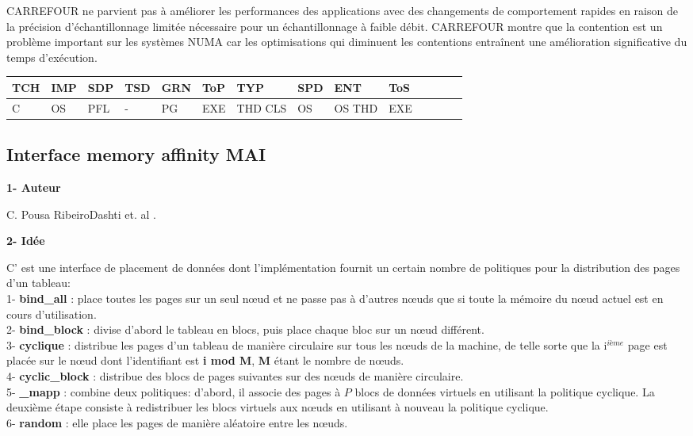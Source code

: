 CARREFOUR ne parvient pas à améliorer les performances des applications avec des changements de comportement rapides en raison de la précision d'échantillonnage limitée nécessaire pour un échantillonnage à faible débit. 
CARREFOUR montre que la contention est un problème important sur les systèmes NUMA car les optimisations qui diminuent les contentions entraînent une amélioration significative du temps d'exécution. 
%
\begin{center}%
\begin{tabular}{l *{13}{l}} 		\hline
{TCH} & {IMP} 	& {SDP} 	&  {TSD} 	& {GRN} 	& {ToP} 	& {TYP} 	& {SPD}	& {ENT} 	& {ToS} \\     		\hline
C     	& OS		& PFL		&  - 		& PG		& EXE		& THD CLS	& OS 		& OS THD  & EXE  \\     		          \hline
\end{tabular}
\end{center}
%
\subsection{Interface memory affinity MAI}    %

\textbf{1- Auteur}

C. Pousa RibeiroDashti et. al \cite{MAI77}.

\textbf{2- Idée}

C' est une interface de placement de données dont l'implémentation fournit un certain nombre de politiques pour la distribution des pages d'un tableau:\\
1- \textbf{bind\_all} : place toutes les pages sur un seul nœud et ne passe pas à d'autres nœuds que si toute la mémoire du nœud actuel est en cours d'utilisation.\\
2- \textbf{bind\_block} : divise d'abord le tableau en blocs, puis place chaque bloc sur un nœud différent.\\ 
3- \textbf{cyclique} : distribue les pages d'un tableau de manière circulaire sur tous les nœuds de la machine, de telle sorte que la i$^{ième}$ page est placée sur le nœud dont l'identifiant est \textbf{i mod M}, \textbf{M} étant le nombre de nœuds. \\
4- \textbf{cyclic\_block} : distribue des blocs de pages suivantes sur des nœuds de manière circulaire.\\
5- \textbf{\_mapp} : combine deux politiques: d'abord, il associe des pages à $P$ blocs de données virtuels en utilisant la politique cyclique. La deuxième étape consiste à redistribuer les blocs virtuels aux nœuds en utilisant à nouveau la politique cyclique. \\
6- \textbf{random} : elle place les pages de manière aléatoire entre les nœuds. 

